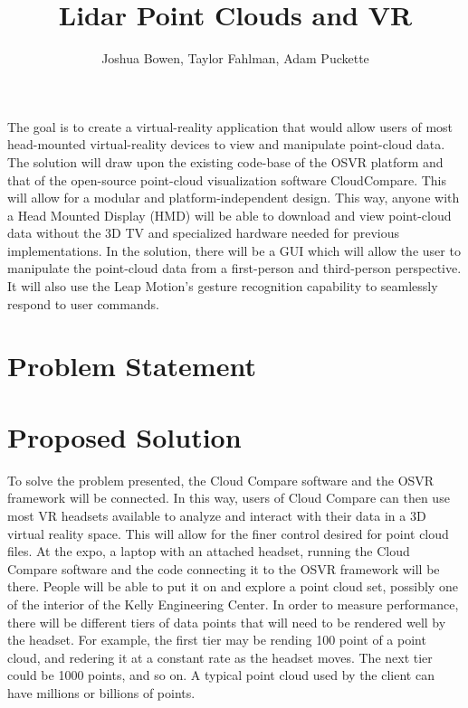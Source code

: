 \documentclass{article}
\begin{document}
\title{Lidar Point Clouds and VR}
\author{Joshua Bowen, Taylor Fahlman, Adam Puckette}

\maketitle

\abstract

The goal is to create a virtual-reality application that would allow users of most head-mounted virtual-reality devices to view and manipulate point-cloud data. The solution will draw upon the existing code-base of the OSVR platform and that of the open-source point-cloud visualization software CloudCompare. This will allow for a modular and platform-independent design. This way, anyone with a Head Mounted Display (HMD) will be able to download and view point-cloud data without the 3D TV and specialized hardware needed for previous implementations. In the solution, there will be a GUI which will allow the user to manipulate the point-cloud data from a first-person and third-person perspective. It will also use the Leap Motion's gesture recognition capability to seamlessly respond to user commands.


\section*{Problem Statement}

\section*{Proposed Solution}

To solve the problem presented, the Cloud Compare software and the OSVR framework will be connected. In this way, users of Cloud Compare can then use most VR headsets available to analyze and interact with their data in a 3D virtual reality space. This will allow for the finer control desired for point cloud files. At the expo, a laptop with an attached headset, running the Cloud Compare software and the code connecting it to the OSVR framework will be there. People will be able to put it on and explore a point cloud set, possibly one of the interior of the Kelly Engineering Center. In order to measure performance, there will be different tiers of data points that will need to be rendered well by the headset. For example, the first tier may be rending 100 point of a point cloud, and redering it at a constant rate as the headset moves. The next tier could be 1000 points, and so on. A typical point cloud used by the client can have millions or billions of points. 
\end{document}
